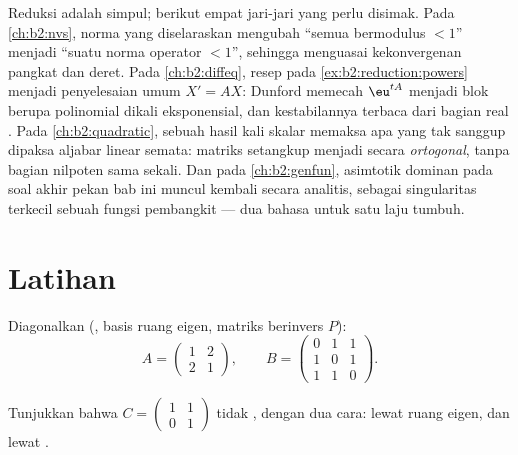 \begin{remark}\label{rem:b2:reduction:perspectives}
Reduksi adalah simpul; berikut empat jari-jari yang perlu disimak. Pada
\cref{ch:b2:nvs}, norma yang diselaraskan mengubah ``semua 
bermodulus $< 1$'' menjadi ``suatu norma operator $< 1$'', sehingga
 menguasai kekonvergenan pangkat dan deret. Pada
\cref{ch:b2:diffeq}, resep pada
\cref{ex:b2:reduction:powers} menjadi penyelesaian umum
$X' = AX$: Dunford memecah $\eu^{tA}$ menjadi blok berupa
polinomial dikali eksponensial, dan kestabilannya terbaca dari
bagian real . Pada \cref{ch:b2:quadratic}, sebuah
hasil kali skalar memaksa apa yang tak sanggup dipaksa aljabar linear
semata: matriks setangkup menjadi  secara
\emph{ortogonal}, tanpa bagian nilpoten sama sekali. Dan pada
\cref{ch:b2:genfun}, asimtotik  dominan pada soal akhir
pekan bab ini muncul kembali secara analitis, sebagai singularitas
terkecil sebuah fungsi pembangkit --- dua bahasa untuk satu laju tumbuh.
\end{remark}

\section{Latihan}

\begin{exercise}[$\star$]\label{exo:b2:reduction:1}
Diagonalkan (, basis ruang eigen, matriks berinvers $P$):
\[
A = \begin{pmatrix} 1 & 2\\ 2 & 1 \end{pmatrix},
\qquad
B = \begin{pmatrix} 0 & 1 & 1\\ 1 & 0 & 1\\ 1 & 1 & 0
\end{pmatrix}.
\]
\end{exercise}

\begin{exercise}[$\star$]\label{exo:b2:reduction:2}
Tunjukkan bahwa $C = \begin{pmatrix} 1 & 1\\ 0 & 1\end{pmatrix}$ tidak
, dengan dua cara: lewat ruang eigen, dan lewat
.
\end{exercise}

